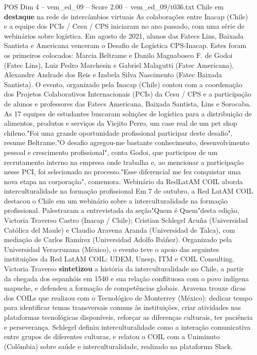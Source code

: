 \begin{textsample}{POS Dim 4 – vem\_ed\_09 – Score 2.00 – vem\_ed\_09/t036.txt}  \label{ex:f4_pos_158}
Chile em \textbf{destaque} na rede de intercâmbios virtuais As colaborações entre Inacap (Chile) e a equipe dos PCIs / Cesu / CPS iniciaram no ano passado, com uma série de webinários sobre logística.
Em agosto de 2021, alunos das Fatecs Lins, Baixada Santista e Americana venceram o Desafio de Logística CPS-Inacap.
Estes foram os primeiros colocados: Marcia Beltrame e Danilo Magnabosco F. de Godoi (Fatec Lins), Luiz Pedro Marchesin e Gabriel Malagutti (Fatec Americana), Alexandre Andrade dos Reis e Izabela Silva Nascimento (Fatec Baixada Santista).
O evento, organizado pela Inacap (Chile) contou com a coordenação dos Projetos Colaborativos Internacionais (PCIs) da Cesu / CPS e a participação de alunos e professores das Fatecs Americana, Baixada Santista, Lins e Sorocaba.
As 17 equipes de estudantes buscaram soluções de logística para a distribuição de alimentos, produtos e serviços da Viejito Perro, um case real de um pet shop chileno."Foi uma grande oportunidade profissional participar deste desafio", resume Beltrame."O desafio agregou-me bastante conhecimento, desenvolvimento pessoal e crescimento profissional", conta Godoi, que participou de um recrutamento interno na empresa onde trabalha e, ao mencionar a participação nesse PCI, foi selecionado no processo."Esse diferencial me fez conquistar uma nova etapa na corporação", comemora.
Webinário da RedLatAM COIL aborda interculturalidade na formação profissional Em 7 de outubro, a Red LatAM COIL destacou o Chile em um webinário sobre a interculturalidade na formação profissional.
Palestraram a entrevistada da seção"Quem é Quem"desta edição, Victoria Traverso Castro (Inacap / Chile); Cristian Schlegel Acuña (Universidad Católica del Maule) e Claudio Aravena Aranda (Universidad de Talca), com mediação de Carlos Ramírez (Universidad Adolfo Ibáñez).
Organizado pela Universidad Veracruzana (México), o evento teve o apoio das seguintes instituições da Red LatAM COIL: UDEM, Unesp, ITM e COIL Consulting.
Victoria Traverso \textbf{sintetizou} a história da interculturalidade no Chile, a partir da chegada dos espanhóis em 1540 e sua relação conflituosa com o povo indígena mapuche, e defendeu a formação de competências globais.
Aravena trouxe dicas dos COILs que realizou com o Tecnológico de Monterrey (México): dedicar tempo para identificar temas transversais comuns às instituições, criar atividades nas plataformas tecnológicas disponíveis, reforçar as diferenças culturais, ter paciência e perseverança.
Schlegel definiu interculturalidade como a interação comunicativa entre grupos de diferentes culturas, e relatou o COIL com a Uniminuto (Colômbia) sobre saúde e interculturalidade, realizado na plataforma Slack.

\end{textsample}
